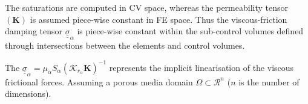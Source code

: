 \documentclass[preprint,authoryear,12pt]{elsarticle}
\begin{document}
The saturations are computed in CV space, whereas the permeability tensor $\left(\mathbf{K}\right)$ is assumed piece-wise constant in FE space. Thus the viscous-friction damping tensor $ {\underline {\underline \sigma}}_{\alpha}$ is piece-wise constant within the sub-control volumes defined through intersections between the elements and control volumes.

\noindent The ${\underline {\underline \sigma}}_{\alpha}=\mu_\alpha S_\alpha \left(\mathcal{K}_{{r}_\alpha}\mathbf{K}\right)^{-1}$ represents the implicit linearisation of the viscous frictional forces. Assuming a porous media domain $\Omega\subset\mathcal{R}^{n}$ ($n$ is the number of dimensions). 
\end{document}
